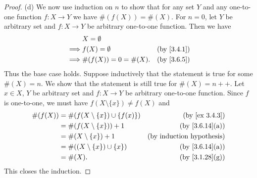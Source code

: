 \begin{proof}{(d)}
  We now use induction on \(n\) to show that for any set \(Y\) and any one-to-one function \(f : X \to Y\) we have \(\#(f(X)) = \#(X)\).
  For \(n = 0\), let \(Y\) be arbitrary set and \(f : X \to Y\) be arbitrary one-to-one function.
  Then we have
  \begin{align*}
             & X = \emptyset                                    \\
    \implies & f(X) = \emptyset      & \text{(by \cref{3.4.1})} \\
    \implies & \#(f(X)) = 0 = \#(X). & \text{(by \cref{3.6.5})}
  \end{align*}
  Thus the base case holds.
  Suppose inductively that the statement is true for some \(\#(X) = n\).
  We show that the statement is still true for \(\#(X) = n++\).
  Let \(x \in X\), \(Y\) be arbitrary set and \(f : X \to Y\) be arbitrary one-to-one function.
  Since \(f\) is one-to-one, we must have \(f(X \setminus \{x\}) \neq f(X)\) and
  \begin{align*}
    \#(f(X)) & = \#(f(X \setminus \{x\}) \cup \{f(x)\}) & \text{(by \cref{ex 3.4.3})}      \\
             & = \#(f(X \setminus \{x\})) + 1           & \text{(by \cref{3.6.14}(a))}     \\
             & = \#(X \setminus \{x\}) + 1              & \text{(by induction hypothesis)} \\
             & = \#((X \setminus \{x\}) \cup \{x\})     & \text{(by \cref{3.6.14}(a))}     \\
             & = \#(X).                                 & \text{(by \cref{3.1.28}(g))}
  \end{align*}
  This closes the induction.
\end{proof}

